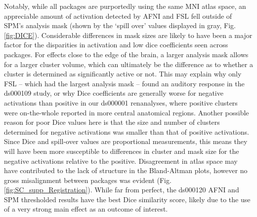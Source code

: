 Notably, while all packages are purportedly using the same MNI atlas space, an appreciable amount of activation detected by AFNI and FSL fell outside of SPM's analysis mask (shown by the `spill over' values displayed in gray, Fig. \ref{fig:DICE}). Considerable differences in mask sizes are likely to have been a major factor for the disparities in activation and low dice coefficients seen across packages. For effects close to the edge of the brain, a larger analysis mask allows for a larger cluster volume, which can ultimately be the difference as to whether a cluster is determined as significantly active or not. This may explain why only FSL -- which had the largest analysis mask -- found an auditory response in the ds000109 study, or why Dice coefficients are generally worse for negative activations than positive in our ds000001 renanalyses, where positive clusters were on-the-whole reported in more central anatomical regions. Another possible reason for poor Dice values here is that the size and number of clusters determined for negative activations was smaller than that of positive activations. Since Dice and spill-over values are proportional measurements, this means they will have been more susceptible to differences in cluster and mask size for the negative activations relative to the positive. Disagreement in atlas space may have contributed to the lack of structure in the Bland-Altman plots, however no gross misalignment between packages was evident (Fig. \ref{fig:SC_supp_Registration}). While far from perfect, the ds000120 AFNI and SPM thresholded results have the best Dice similarity score, likely due to the use of a very strong main effect as an outcome of interest.

